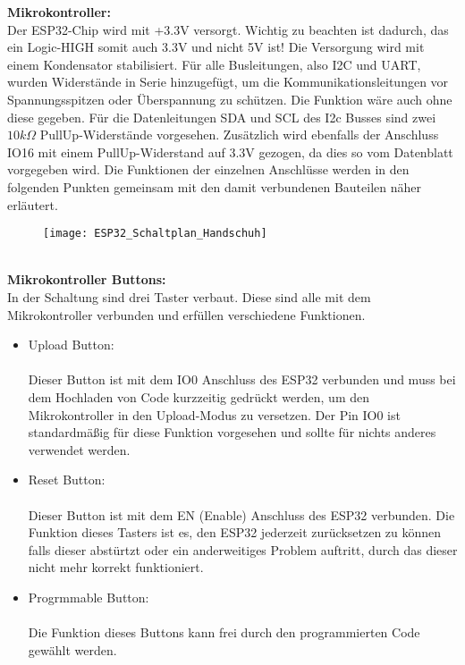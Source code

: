 \documentclass[11pt]{article}
\begin{document}
\textbf{Mikrokontroller:} 
\\
Der ESP32-Chip wird mit +3.3V versorgt. Wichtig zu beachten ist dadurch, das ein Logic-HIGH somit auch 3.3V und nicht 5V ist!
Die Versorgung wird mit einem Kondensator stabilisiert. Für alle Busleitungen, also I2C und UART, wurden Widerstände in Serie
hinzugefügt, um die Kommunikationsleitungen vor Spannungsspitzen oder Überspannung zu schützen. Die Funktion wäre auch ohne diese
gegeben. Für die Datenleitungen SDA und SCL des I2c Busses sind zwei $10k\Omega$ PullUp-Widerstände vorgesehen. Zusätzlich 
wird ebenfalls der Anschluss IO16 mit einem PullUp-Widerstand auf 3.3V gezogen, da dies so vom Datenblatt vorgegeben wird. 
Die Funktionen der einzelnen Anschlüsse werden in den folgenden Punkten gemeinsam mit den damit verbundenen Bauteilen näher erläutert. \\
\begin{figure}[H]
	\begin{center}
		\scalebox{0.5}
		{\texttt{[image: ESP32\_Schaltplan\_Handschuh]}}
	\end{center}
\end{figure}
\\
\textbf{Mikrokontroller Buttons:}
\\
In der Schaltung sind drei Taster verbaut. Diese sind alle mit dem Mikrokontroller verbunden und erfüllen verschiedene Funktionen.
\begin{itemize}
	\item Upload Button: \\
		  \\ 
		  Dieser Button ist mit dem IO0 Anschluss des ESP32 verbunden und muss bei dem Hochladen von Code kurzzeitig gedrückt 
		  werden, um den Mikrokontroller in den Upload-Modus zu versetzen. Der Pin IO0 ist standardmäßig für diese Funktion vorgesehen
		  und sollte für nichts anderes verwendet werden. 
	\item Reset Button: \\
		  \\
		  Dieser Button ist mit dem EN (Enable) Anschluss des ESP32 verbunden. Die Funktion dieses Tasters ist es, den ESP32 jederzeit 
		  zurücksetzen zu können falls dieser abstürtzt oder ein anderweitiges Problem auftritt, durch das dieser nicht mehr korrekt
		  funktioniert.
	\item Progrmmable Button: \\
		  \\
		  Die Funktion dieses Buttons kann frei durch den programmierten Code gewählt werden. 
\end{itemize}
\end{document}
